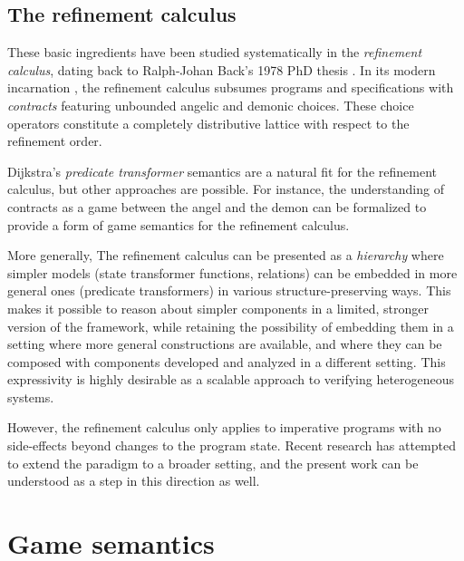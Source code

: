\documentclass[draft,11pt]{report}
\theoremstyle{definition}
\begin{document}

\subsection{The refinement calculus} %

These basic ingredients have been studied systematically
in the \emph{refinement calculus},
dating back to Ralph-Johan Back's 1978 PhD thesis \citep{backthesis}.
In its modern incarnation \citep{refcal},
the refinement calculus
subsumes programs and specifications with \emph{contracts}
featuring unbounded angelic and demonic choices.
These choice operators
constitute a completely distributive lattice
with respect to the refinement order.

Dijkstra's \emph{predicate transformer} semantics \citep{gc}
are a natural fit for the refinement calculus,
but other approaches are possible.
For instance,
the understanding of contracts as a game between
the angel and the demon
can be formalized to provide a form of
game semantics for the refinement calculus.

More generally,
The refinement calculus can be presented as a \emph{hierarchy}
where simpler models (state transformer functions, relations)
can be embedded in more general ones (predicate transformers)
in various structure-preserving ways.
This makes it possible to reason about simpler components
in a limited, stronger version of the framework,
while retaining the possibility of embedding them
in a setting
where more general constructions are available,
and where they can be composed with components
developed and analyzed in a different setting.
This expressivity is highly desirable
as a scalable approach to
verifying heterogeneous systems.

However,
the refinement calculus only applies to imperative programs
with no side-effects beyond changes to the program state.
Recent research has attempted to extend the paradigm
to a broader setting,
and the present work can be understood
as a step in this direction as well.



\section{Game semantics} \label{sec:bg:gamesem} %

\end{document}

